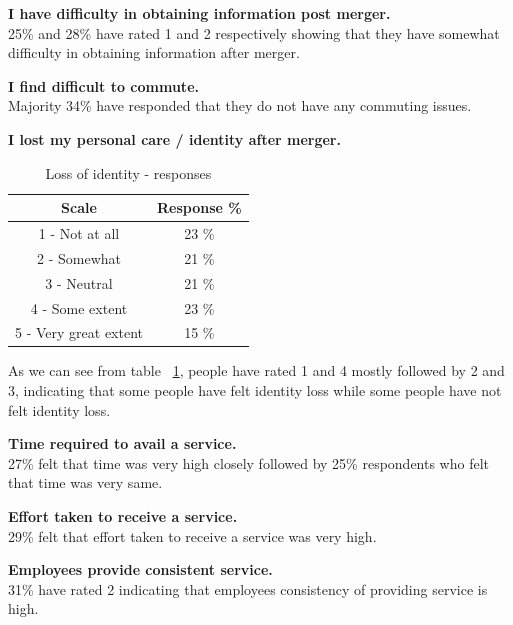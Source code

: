 \documentclass[a4paper, 12pt]{extarticle}
\begin{document}
{\textbf{ I have difficulty in obtaining information post merger. } \\
25\% and 28\% have rated 1 and 2 respectively showing that they have somewhat difficulty in obtaining information after merger.\\

\par \textbf{ I find difficult to commute.} \\
 Majority 34\% have responded that they do not have any commuting issues.    

\par \textbf{ I lost my personal care / identity after merger. }  \\
\begin{table}[H]
\centering
\begin{tabular}{|c|c|}
\hline
Scale & Response \% \\
\hline
1 - Not at all & 23 \% \\
\hline
2 - Somewhat & 21 \% \\
\hline
3 - Neutral & 21 \% \\
\hline
4 - Some extent & 23 \% \\
\hline
5 - Very great extent & 15 \% \\
\hline
\end{tabular}
\caption{Loss of identity - responses}
\label{table:identity_loss}
\end{table}
As we can see from table ~\ref{table:identity_loss}, people have rated 1 and 4 mostly followed by 2 and 3, indicating that some people have felt identity loss while some people have not felt identity loss. \\
\newpage
\par \textbf{ Time required to avail a service.} \\
27\% felt that time was very high closely followed by 25\% respondents who felt that time was very same.\\

\par \textbf{ Effort taken to receive a service.} \\ 
29\% felt that effort taken to receive a service was very high.\\

\par \textbf{ Employees provide consistent service.} \\  
31\% have rated 2 indicating that employees consistency of providing service is high. \\

}
\end{document}
